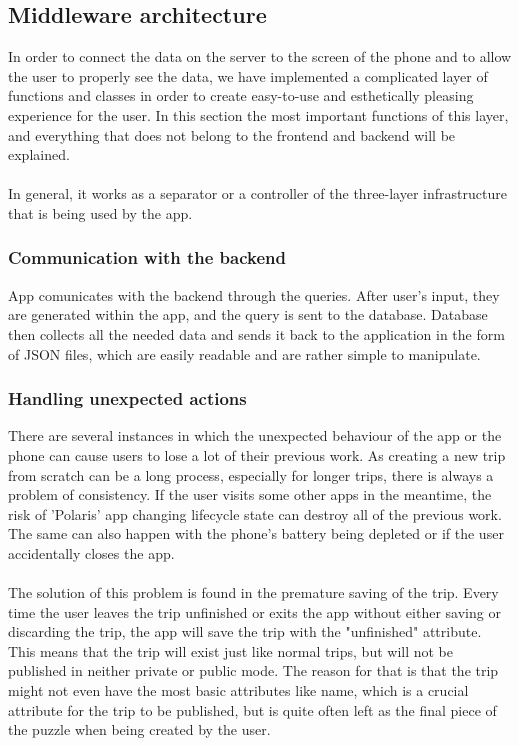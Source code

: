 \subsection{Middleware architecture}
\hspace{\parindent}In order to connect the data on the server to the screen of the phone and to allow the user to properly see the data, we have implemented a complicated layer of functions and classes in order to create easy-to-use and esthetically pleasing experience for the user. In this section the most important functions of this layer, and everything that does not belong to the frontend and backend will be explained.\\ \\
In general, it works as a separator or a controller of the three-layer infrastructure that is being used by the app.
\subsubsection{Communication with the backend}
\hspace{\parindent}App comunicates with the backend through the queries. After user's input, they are generated within the app, and the query is sent to the database. Database then collects all the needed data and sends it back to the application in the form of JSON files, which are easily readable and are rather simple to manipulate. 

\subsubsection{Handling unexpected actions}
\hspace{\parindent}There are several instances in which the unexpected behaviour of the app or the phone can cause users to lose a lot of their previous work. As creating a new trip from scratch can be a long process, especially for longer trips, there is always a problem of consistency. If the user visits some other apps in the meantime, the risk of 'Polaris' app changing lifecycle state can destroy all of the previous work. The same can also happen with the phone's battery being depleted or if the user accidentally closes the app.\\ \\

The solution of this problem is found in the premature saving of the trip. Every time the user leaves the trip unfinished or exits the app without either saving or discarding the trip, the app will save the trip with the "unfinished" attribute. This means that the trip will exist just like normal trips, but will not be published in neither private or public mode. The reason for that is that the trip might not even have the most basic attributes like name, which is a crucial attribute for the trip to be published, but is quite often left as the final piece of the puzzle when being created by the user.\\ \\

